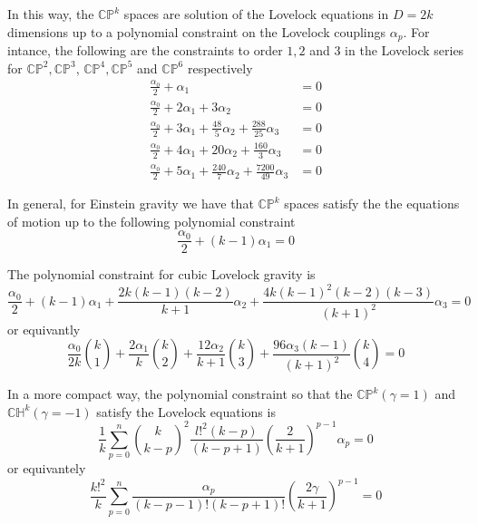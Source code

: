 In this way, the $\mathbb{CP}^k$ spaces are solution of the Lovelock equations in $D=2k$ dimensions up to a polynomial constraint on the Lovelock couplings $\alpha_p$. For intance, the following are the constraints to order $1,2$ and $3$ in the Lovelock series for $\mathbb{CP}^2,\mathbb{CP}^3$, $\mathbb{CP}^4,\mathbb{CP}^5$ and $\mathbb{CP}^6$ respectively
\begin{align*}
    \frac{\alpha_0}{2}+\alpha_1&=0\\
    \frac{\alpha_0}{2}+2\alpha_1+3\alpha_2&=0\\
    \frac{\alpha_0}{2}+3\alpha_1+\frac{48}{5}\alpha_2+\frac{288}{25}\alpha_3&=0\\
    \frac{\alpha_0}{2}+4\alpha_1+20\alpha_2+\frac{160}{3}\alpha_3&=0\\
    \frac{\alpha_0}{2}+5\alpha_1+\frac{240}{7}\alpha_2+\frac{7200}{49}\alpha_3&=0
\end{align*}

In general, for Einstein gravity we have that $\mathbb{CP}^k$ spaces satisfy the the equations of motion up to the following polynomial constraint
\begin{equation*}
    \frac{\alpha_0}{2}+(k-1)\alpha_1=0
\end{equation*}

The polynomial constraint for cubic Lovelock gravity is
\begin{equation*}
    \frac{\alpha_0}{2}+(k-1)\alpha_1+\frac{2k(k-1)(k-2)}{k+1}\alpha_2+\frac{4k(k-1)^2(k-2)(k-3)}{(k+1)^2}\alpha_3=0
\end{equation*}
or equivantly
\begin{equation*}
    \frac{\alpha_0}{2k}\binom{k}{1}+\frac{2\alpha_1}{k}\binom{k}{2}+\frac{12\alpha_2}{k+1}\binom{k}{3}+\frac{96\alpha_3(k-1)}{(k+1)^2}\binom{k}{4}=0
\end{equation*}

\begin{tcolorbox}
In a more compact way, the polynomial constraint so that the $\mathbb{CP}^k (\gamma=1)$ and $\mathbb{CH}^k (\gamma=-1)$ satisfy the Lovelock equations is
\begin{equation*}
    \frac{1}{k}\sum_{p=0}^n\binom{k}{k-p}^2\frac{l!^2(k-p)}{(k-p+1)}\left(\frac{2}{k+1}\right)^{p-1}\alpha_p=0
\end{equation*}
or equivantely
\begin{equation*}
    \frac{k!^2}{k}\sum_{p=0}^n\frac{\alpha_p}{(k-p-1)!(k-p+1)!}\left(\frac{2\gamma}{k+1}\right)^{p-1}=0
\end{equation*}
\end{tcolorbox}

